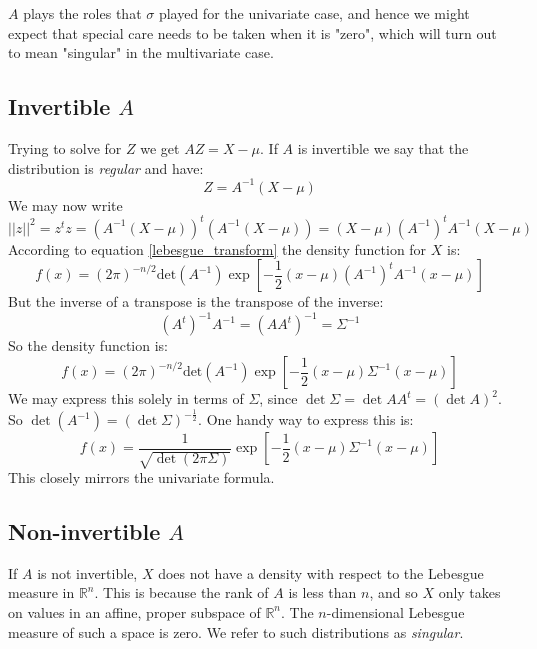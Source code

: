 \documentclass[12pt, a4paper]{article}
\numberwithin{equation}{section}
\begin{document}
$A$ plays the roles that $\sigma$ played for the univariate case, and hence we might expect that special care needs to be taken when it is "zero", which will turn out to mean "singular" in the multivariate case.

\subsection{Invertible $A$}
Trying to solve for $Z$ we get $AZ=X-\mu$. If $A$ is invertible we say that the distribution is \textit{regular} and have:
\begin{equation}
Z=A^{-1}(X-\mu)
\end{equation}
We may now write
\begin{equation}
||z||^2=z^t z=\left(A^{-1}(X-\mu)\right)^t\left(A^{-1}(X-\mu)\right)=(X-\mu)\left(A^{-1}\right)^t A^{-1}(X-\mu)
\end{equation}
According to equation \ref{lebesgue_transform} the density function for $X$ is:
\begin{equation}
f(x)=(2\pi)^{-n/2}\textrm{det}(A^{-1})\exp\left[-\frac{1}{2}(x-\mu)\left(A^{-1}\right)^t A^{-1}(x-\mu)\right]
\end{equation}
But the inverse of a transpose is the transpose of the inverse:
\begin{equation}
\left(A^t\right)^{-1}A^{-1}=\left(AA^t\right)^{-1}=\Sigma^{-1}
\end{equation}
So the density function is:
\begin{equation}
f(x)=(2\pi)^{-n/2}\textrm{det}(A^{-1})\exp\left[-\frac{1}{2}(x-\mu)\Sigma^{-1}(x-\mu)\right]
\end{equation}
We may express this solely in terms of $\Sigma$, since $\det\Sigma=\det AA^t=(\det A)^2$. So $\det(A^{-1})=(\det\Sigma)^{-\frac{1}{2}}$. One handy way to express this is:
\begin{equation}
\label{mvn_density}
f(x)=\frac{1}{\sqrt{\det(2\pi\Sigma)}}\exp\left[-\frac{1}{2}(x-\mu)\Sigma^{-1}(x-\mu)\right]
\end{equation}
This closely mirrors the univariate formula.

\subsection{Non-invertible $A$}
If $A$ is not invertible, $X$ does not have a density with respect to the Lebesgue measure in $\mathbb{R}^n$. This is because the rank of $A$ is less than $n$, and so $X$ only takes on values in an affine, proper subspace of $\mathbb{R}^n$. The $n$-dimensional Lebesgue measure of such a space is zero. We refer to such distributions as \textit{singular}.
\end{document}
